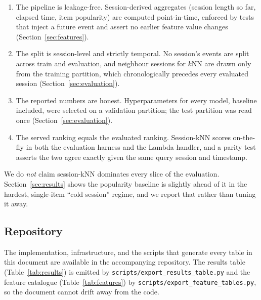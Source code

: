 \begin{enumerate}
  \item The pipeline is leakage-free. Session-derived aggregates (session
        length so far, elapsed time, item popularity) are computed
        point-in-time, enforced by tests that inject a future event and
        assert no earlier feature value changes
        (Section~\ref{sec:features}).
  \item The split is session-level and strictly temporal. No session's
        events are split across train and evaluation, and neighbour sessions
        for $k$NN are drawn only from the training partition, which
        chronologically precedes every evaluated session
        (Section~\ref{sec:evaluation}).
  \item The reported numbers are honest. Hyperparameters for every model,
        baseline included, were selected on a validation partition; the test
        partition was read once (Section~\ref{sec:evaluation}).
  \item The served ranking equals the evaluated ranking. Session-kNN scores
        on-the-fly in both the evaluation harness and the Lambda handler, and
        a parity test asserts the two agree exactly given the same query
        session and timestamp.
\end{enumerate}

We do \emph{not} claim session-kNN dominates every slice of the evaluation.
Section~\ref{sec:results} shows the popularity baseline is slightly ahead of
it in the hardest, single-item ``cold session'' regime, and we report that
rather than tuning it away.

\subsection{Repository}

The implementation, infrastructure, and the scripts that generate every table
in this document are available in the accompanying repository. The results
table (Table~\ref{tab:results}) is emitted by
\texttt{scripts/export\_results\_table.py} and the feature catalogue
(Table~\ref{tab:features}) by \texttt{scripts/export\_feature\_tables.py},
so the document cannot drift away from the code.
